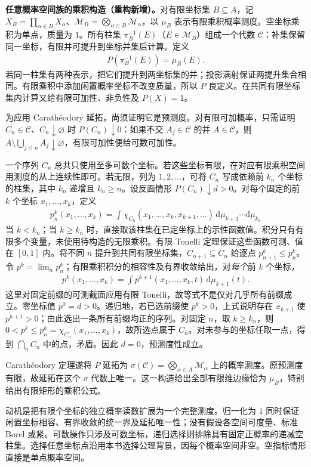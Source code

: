 \documentclass[../../main.tex]{subfiles}
\begin{document}
\begin{remark}
\textbf{任意概率空间族的乘积构造（重构新增）。}对有限坐标集 $B\subseteq A$，记 $X_B=\prod_{\alpha\in B}X_\alpha$、$\mathscr M_B=\bigotimes_{\alpha\in B}\mathscr M_\alpha$，以 $\mu_B$ 表示有限乘积概率测度。空坐标乘积为单点，质量为 $1$。所有柱集 $\pi_B^{-1}(E)$（$E\in\mathscr M_B$）组成一个代数 $\mathcal C$：补集保留同一坐标，有限并可提升到坐标并集后计算。定义
\begin{align*}
P(\pi_B^{-1}(E))=\mu_B(E).
\end{align*}
若同一柱集有两种表示，把它们提升到两坐标集的并；投影满射保证两提升集合相同。有限乘积中添加闲置概率坐标不改变质量，所以 $P$ 良定义。在共同有限坐标集内计算又给有限可加性、非负性及 $P(X)=1$。

为应用 Carathéodory 延拓，尚须证明它是预测度。对有限可加概率，只需证明 $C_n\in\mathcal C$、$C_n\downarrow\varnothing$ 时 $P(C_n)\downarrow0$：如果不交 $A_j\in\mathcal C$ 的并 $A\in\mathcal C$，则 $A\setminus\bigcup_{j\leqslant n}A_j\downarrow\varnothing$，有限可加性便给可数可加性。

一个序列 $C_n$ 总共只使用至多可数个坐标。若这些坐标有限，在对应有限乘积空间用测度的从上连续性即可。若无限，列为 $1,2,\ldots$，可将 $C_n$ 写成依赖前 $k_n$ 个坐标的柱集，其中 $k_n$ 递增且 $k_n\geqslant n$。设反面情形 $P(C_n)\downarrow d>0$。对每个固定的前 $k$ 个坐标 $x_1,\ldots,x_k$，定义
\begin{align*}
p_n^k(x_1,\ldots,x_k)
=\int\chi_{C_n}(x_1,\ldots,x_k,x_{k+1},\ldots)
\,\mathrm d\mu_{k+1}\cdots\mathrm d\mu_{k_n}
\end{align*}
当 $k<k_n$；当 $k\geqslant k_n$ 时，直接取该柱集在已定坐标上的示性函数值。积分只有有限多个变量，未使用待构造的无限乘积。有限 Tonelli 定理保证这些函数可测、值在 $[0,1]$ 内。将不同 $n$ 提升到共同有限坐标集，$C_{n+1}\subseteq C_n$ 给逐点 $p_{n+1}^k\leqslant p_n^k$。令 $p^k=\lim_np_n^k$；有限乘积积分的相容性及有界收敛给出，对\emph{每个}前 $k$ 个坐标，
\begin{align*}
p^k(x_1,\ldots,x_k)
=\int p^{k+1}(x_1,\ldots,x_k,t)\,\mathrm d\mu_{k+1}(t).
\end{align*}
这里对固定前缀的可测截面应用有限 Tonelli，故等式不是仅对几乎所有前缀成立。零坐标值 $p^0=d>0$。递归地，若已选前缀使 $p^k>0$，上式说明存在 $x_{k+1}$ 使 $p^{k+1}>0$；由此选出一条所有前缀均正的序列。对固定 $n$，取 $k\geqslant k_n$，则 $0<p^k\leqslant p_n^k=\chi_{C_n}(x_1,\ldots,x_k)$，故所选点属于 $C_n$。对未参与的坐标任取一点，得到 $\bigcap_nC_n$ 中的点，矛盾。因此 $d=0$，预测度性成立。

Carathéodory 定理遂将 $P$ 延拓为 $\sigma(\mathcal C)=\bigotimes_{\alpha\in A}\mathscr M_\alpha$ 上的概率测度。原预测度有限，故延拓在这个 $\sigma$ 代数上唯一。这一构造给出全部有限维边缘恰为 $\mu_B$，特别给出有限矩形的乘积公式。

动机是把有限个坐标的独立概率读数扩展为一个完整测度。归一化为 $1$ 同时保证闲置坐标相容、有界收敛的统一界及延拓唯一性；没有假设各空间可度量、标准 Borel 或紧。可数操作只涉及可数坐标，递归选择则排除具有固定正概率的递减空柱集。选择任意坐标点沿用本书选择公理背景，因每个概率空间非空。空指标情形直接是单点概率空间。
\end{remark}
\end{document}
